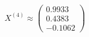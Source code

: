 \documentclass[preview]{standalone}
\begin{document}
\begin{align*}
X^{(4)} \approx \begin{pmatrix} 0.9933 \\ 0.4383 \\ -0.1062 \end{pmatrix}
\end{align*}
\end{document}
